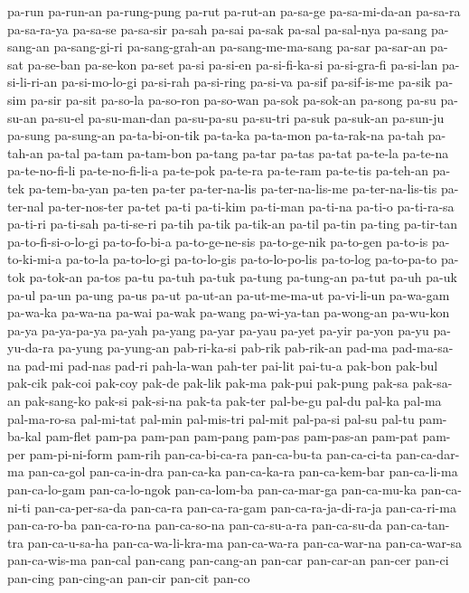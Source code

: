 {pa-run pa-run-an pa-rung-pung pa-rut pa-rut-an pa-sa-ge pa-sa-mi-da-an
pa-sa-ra pa-sa-ra-ya pa-sa-se pa-sa-sir pa-sah pa-sai pa-sak pa-sal
pa-sal-nya pa-sang pa-sang-an pa-sang-gi-ri pa-sang-grah-an
pa-sang-me-ma-sang pa-sar pa-sar-an pa-sat pa-se-ban pa-se-kon pa-set
pa-si pa-si-en pa-si-fi-ka-si pa-si-gra-fi pa-si-lan pa-si-li-ri-an
pa-si-mo-lo-gi pa-si-rah pa-si-ring pa-si-va pa-sif pa-sif-is-me pa-sik
pa-sim pa-sir pa-sit pa-so-la pa-so-ron pa-so-wan pa-sok pa-sok-an pa-song
pa-su pa-su-an pa-su-el pa-su-man-dan pa-su-pa-su pa-su-tri pa-suk
pa-suk-an pa-sun-ju pa-sung pa-sung-an pa-ta-bi-on-tik pa-ta-ka pa-ta-mon
pa-ta-rak-na pa-tah pa-tah-an pa-tal pa-tam pa-tam-bon pa-tang pa-tar
pa-tas pa-tat pa-te-la pa-te-na pa-te-no-fi-li pa-te-no-fi-li-a pa-te-pok
pa-te-ra pa-te-ram pa-te-tis pa-teh-an pa-tek pa-tem-ba-yan pa-ten pa-ter
pa-ter-na-lis pa-ter-na-lis-me pa-ter-na-lis-tis pa-ter-nal pa-ter-nos-ter
pa-tet pa-ti pa-ti-kim pa-ti-man pa-ti-na pa-ti-o pa-ti-ra-sa pa-ti-ri
pa-ti-sah pa-ti-se-ri pa-tih pa-tik pa-tik-an pa-til pa-tin pa-ting
pa-tir-tan pa-to-fi-si-o-lo-gi pa-to-fo-bi-a pa-to-ge-ne-sis pa-to-ge-nik
pa-to-gen pa-to-is pa-to-ki-mi-a pa-to-la pa-to-lo-gi pa-to-lo-gis
pa-to-lo-po-lis pa-to-log pa-to-pa-to pa-tok pa-tok-an pa-tos pa-tu pa-tuh
pa-tuk pa-tung pa-tung-an pa-tut pa-uh pa-uk pa-ul pa-un pa-ung pa-us
pa-ut pa-ut-an pa-ut-me-ma-ut pa-vi-li-un pa-wa-gam pa-wa-ka pa-wa-na
pa-wai pa-wak pa-wang pa-wi-ya-tan pa-wong-an pa-wu-kon pa-ya pa-ya-pa-ya
pa-yah pa-yang pa-yar pa-yau pa-yet pa-yir pa-yon pa-yu pa-yu-da-ra
pa-yung pa-yung-an pab-ri-ka-si pab-rik pab-rik-an pad-ma pad-ma-sa-na
pad-mi pad-nas pad-ri pah-la-wan pah-ter pai-lit pai-tu-a pak-bon pak-bul
pak-cik pak-coi pak-coy pak-de pak-lik pak-ma pak-pui pak-pung pak-sa
pak-sa-an pak-sang-ko pak-si pak-si-na pak-ta pak-ter pal-be-gu pal-du
pal-ka pal-ma pal-ma-ro-sa pal-mi-tat pal-min pal-mis-tri pal-mit
pal-pa-si pal-su pal-tu pam-ba-kal pam-flet pam-pa pam-pan pam-pang
pam-pas pam-pas-an pam-pat pam-per pam-pi-ni-form pam-rih pan-ca-bi-ca-ra
pan-ca-bu-ta pan-ca-ci-ta pan-ca-dar-ma pan-ca-gol pan-ca-in-dra pan-ca-ka
pan-ca-ka-ra pan-ca-kem-bar pan-ca-li-ma pan-ca-lo-gam pan-ca-lo-ngok
pan-ca-lom-ba pan-ca-mar-ga pan-ca-mu-ka pan-ca-ni-ti pan-ca-per-sa-da
pan-ca-ra pan-ca-ra-gam pan-ca-ra-ja-di-ra-ja pan-ca-ri-ma pan-ca-ro-ba
pan-ca-ro-na pan-ca-so-na pan-ca-su-a-ra pan-ca-su-da pan-ca-tan-tra
pan-ca-u-sa-ha pan-ca-wa-li-kra-ma pan-ca-wa-ra pan-ca-war-na
pan-ca-war-sa pan-ca-wis-ma pan-cal pan-cang pan-cang-an pan-car
pan-car-an pan-cer pan-ci pan-cing pan-cing-an pan-cir pan-cit pan-co
}
